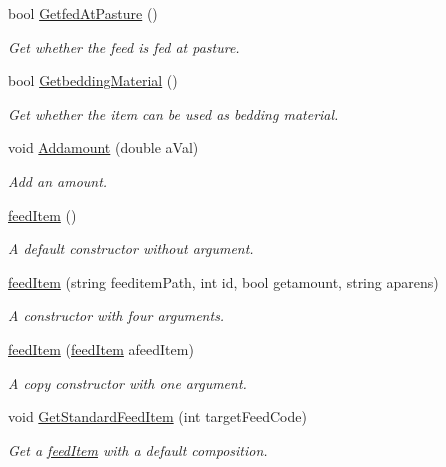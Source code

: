\begin{DoxyCompactItemize}
bool \mbox{\hyperlink{classfeed_item_a2ac9193880ba846aa5d36a440b403dd2}{Getfed\+At\+Pasture}} ()
\begin{DoxyCompactList}\small\item\em Get whether the feed is fed at pasture. \end{DoxyCompactList}\item 
bool \mbox{\hyperlink{classfeed_item_a0c317f7da87544acbc40bde36f78dd76}{Getbedding\+Material}} ()
\begin{DoxyCompactList}\small\item\em Get whether the item can be used as bedding material. \end{DoxyCompactList}\item 
void \mbox{\hyperlink{classfeed_item_a7b662aa8b1ac382a6c2e27e45ca486bd}{Addamount}} (double a\+Val)
\begin{DoxyCompactList}\small\item\em Add an amount. \end{DoxyCompactList}\item 
\mbox{\label{classfeed_item_a724ed9b301bf4696a844e92b6bd49980}} 
\mbox{\hyperlink{classfeed_item_a724ed9b301bf4696a844e92b6bd49980}{feed\+Item}} ()
\begin{DoxyCompactList}\small\item\em A default constructor without argument. \end{DoxyCompactList}\item 
\mbox{\hyperlink{classfeed_item_ac121aceac1fceb9849bdd8f8ddbb843f}{feed\+Item}} (string feeditem\+Path, int id, bool getamount, string aparens)
\begin{DoxyCompactList}\small\item\em A constructor with four arguments. \end{DoxyCompactList}\item 
\mbox{\hyperlink{classfeed_item_a949d4268d916d82df8bfd9c59e348410}{feed\+Item}} (\mbox{\hyperlink{classfeed_item}{feed\+Item}} afeed\+Item)
\begin{DoxyCompactList}\small\item\em A copy constructor with one argument. \end{DoxyCompactList}\item 
void \mbox{\hyperlink{classfeed_item_aa72ab2d2d970e988b2f739e0abccf031}{Get\+Standard\+Feed\+Item}} (int target\+Feed\+Code)
\begin{DoxyCompactList}\small\item\em Get a \mbox{\hyperlink{classfeed_item}{feed\+Item}} with a default composition. \end{DoxyCompactList}\item 

\end{DoxyCompactItemize}
